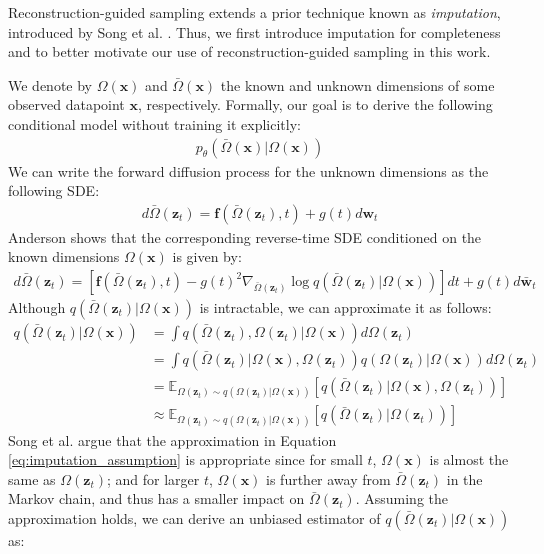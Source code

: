 \documentclass[ oneside,%
                    author={George Herbert},
                    degree={MSci},
                     title={Diffusion Models for Time-Evolving Precipitation Fields},
                  subtitle={}]{dissertation}
\begin{document}
Reconstruction-guided sampling extends a prior technique known as \textit{imputation}, introduced by Song et al. \cite{Score_Based_Song}. Thus, we first introduce imputation for completeness and to better motivate our use of reconstruction-guided sampling in this work.

We denote by $\Omega(\mathbf{x})$ and $\bar\Omega(\mathbf{x})$ the known and unknown dimensions of some observed datapoint $\mathbf{x}$, respectively. Formally, our goal is to derive the following conditional model without training it explicitly:
\begin{align}
      p_\theta(\bar\Omega(\mathbf{x})|\Omega(\mathbf{x}))
\end{align}
We can write the forward diffusion process for the unknown dimensions as the following SDE:
\begin{align}
      d\bar\Omega(\mathbf{z}_t)=\mathbf{f}(\bar\Omega(\mathbf{z}_t), t) + g(t)d\mathbf{w}_t
\end{align}
Anderson \cite{Reverse_Time_Diffusion_Anderson} shows that the corresponding reverse-time SDE conditioned on the known dimensions $\Omega(\mathbf{x})$ is given by:
\begin{align}
      d\bar\Omega(\mathbf{z}_t)=\left[\mathbf{f}(\bar\Omega(\mathbf{z}_t), t) - g(t)^2\nabla_{\bar\Omega(\mathbf{z}_t)}\log q(\bar\Omega(\mathbf{z}_t)|\Omega(\mathbf{x}))\right]dt + g(t)d \bar{\mathbf{w}}_t\label{eq:recon_reverse_sde}
\end{align}
Although $q(\bar\Omega(\mathbf{z}_t)|\Omega(\mathbf{x}))$ is intractable, we can approximate it as follows:
\begin{align}
      q(\bar\Omega(\mathbf{z}_t)|\Omega(\mathbf{x}))&=\int q(\bar\Omega(\mathbf{z}_t), \Omega(\mathbf{z}_t)|\Omega(\mathbf{x}))d\Omega(\mathbf{z}_t)\\
      &=\int q(\bar\Omega(\mathbf{z}_t)|\Omega(\mathbf{x}), \Omega(\mathbf{z}_t))q(\Omega(\mathbf{z}_t)|\Omega(\mathbf{x})) d\Omega(\mathbf{z}_t)\\
      &=\mathbb{E}_{\Omega(\mathbf{z}_t)\sim q(\Omega(\mathbf{z}_t)|\Omega(\mathbf{x}))}\left[q(\bar\Omega(\mathbf{z}_t)|\Omega(\mathbf{x}), \Omega(\mathbf{z}_t))\right]\\
      &\approx \mathbb{E}_{\Omega(\mathbf{z}_t)\sim q(\Omega(\mathbf{z}_t)|\Omega(\mathbf{x}))}\left[q(\bar\Omega(\mathbf{z}_t)| \Omega(\mathbf{z}_t))\right]\label{eq:imputation_assumption}
\end{align}
Song et al. \cite{Score_Based_Song} argue that the approximation in Equation \ref{eq:imputation_assumption} is appropriate since for small $t$, $\Omega(\mathbf{x})$ is almost the same as $\Omega(\mathbf{z}_t)$; and for larger $t$, $\Omega(\mathbf{x})$ is further away from $\bar\Omega(\mathbf{z}_t)$ in the Markov chain, and thus has a smaller impact on $\bar\Omega(\mathbf{z}_t)$. Assuming the approximation holds, we can derive an unbiased estimator of $q(\bar\Omega(\mathbf{z}_t)|\Omega(\mathbf{x}))$ as:
\end{document}
